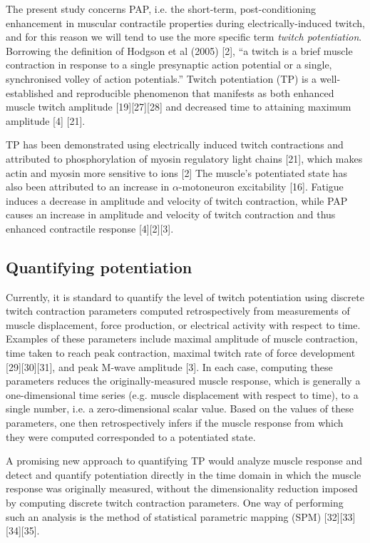 \documentclass[utf8]{style/FrontiersinHarvard}
\begin{document}
The present study concerns PAP, i.e. the short-term, post-conditioning enhancement in muscular contractile properties during electrically-induced twitch, and for this reason we will tend to use the more specific term \textit{twitch potentiation}.
Borrowing the definition of Hodgson et al (2005) [2],
``a twitch is a brief muscle contraction in response to a single presynaptic action potential or a single, synchronised volley of action potentials.''
Twitch potentiation (TP) is a well-established and reproducible phenomenon that manifests as both enhanced muscle twitch amplitude [19][27][28] and decreased time to attaining maximum amplitude [4] \cite{sale} [21].

TP has been demonstrated using electrically induced twitch contractions and attributed to phosphorylation of myosin regulatory light chains [21], which makes actin and myosin more sensitive to  ions [2]
The muscle's potentiated state has also been attributed to an increase in $ \alpha $-motoneuron excitability [16].
Fatigue induces a decrease in amplitude and velocity of twitch contraction, while PAP causes an increase in amplitude and velocity of twitch contraction and thus enhanced contractile response [4][2][3].

\subsection{Quantifying potentiation}
Currently, it is standard to quantify the level of twitch potentiation using discrete twitch contraction parameters computed retrospectively from measurements of muscle displacement, force production, or electrical activity with respect to time.
Examples of these parameters include maximal amplitude of muscle contraction, time taken to reach peak contraction, maximal twitch rate of force development [29][30][31], and peak M-wave amplitude [3].
In each case, computing these parameters reduces the originally-measured muscle response, which is generally a one-dimensional time series (e.g. muscle displacement with respect to time), to a single number, i.e. a zero-dimensional scalar value.
Based on the values of these parameters, one then retrospectively infers if the muscle response from which they were computed corresponded to a potentiated state.

A promising new approach to quantifying TP would analyze 
muscle response and detect and quantify potentiation directly in the time domain in which the muscle response was originally measured, without the dimensionality reduction imposed by computing discrete twitch contraction parameters.
One way of performing such an analysis is the method of statistical parametric mapping (SPM) [32][33][34][35].
\end{document}
